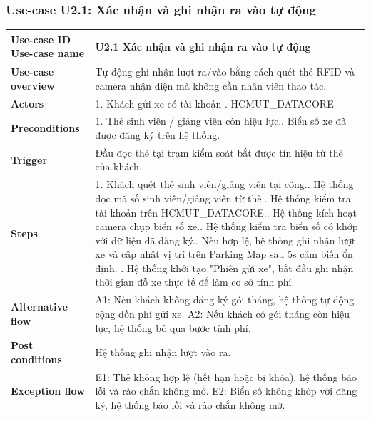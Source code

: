 \subsubsection{Use-case U2.1: Xác nhận và ghi nhận ra vào tự động}
\vspace{0.5cm}
\noindent
\begin{tabularx}{\textwidth}{|>{\raggedright\arraybackslash}p{4cm}|X|}
\hline
\textbf{Use-case ID} \newline \textbf{Use-case name} & U2.1 \newline \textbf{Xác nhận và ghi nhận ra vào tự động} \\ \hline
\textbf{Use-case overview} & Tự động ghi nhận lượt ra/vào bằng cách quét thẻ RFID và camera nhận diện mà không cần nhân viên thao tác.\\ \hline
\textbf{Actors} & 1. Khách gửi xe có tài khoản \newline 2. HCMUT\_DATACORE  \\ \hline
\textbf{Preconditions} &
1. Thẻ sinh viên / giảng viên còn hiệu lực.\newline
2. Biển số xe đã được đăng ký trên hệ thống. \\ \hline
\textbf{Trigger} & Đầu đọc thẻ tại trạm kiểm soát bắt được tín hiệu từ thẻ của khách. \\ \hline

\textbf{Steps} &
1. Khách quét thẻ sinh viên/giảng viên tại cổng.\newline
2. Hệ thống đọc mã số sinh viên/giảng viên từ thẻ.\newline
3. Hệ thống kiểm tra tài khoản trên HCMUT\_DATACORE.\newline
4. Hệ thống kích hoạt camera chụp biển số xe.\newline
5. Hệ thống kiểm tra biển số có khớp với dữ liệu đã đăng ký.\newline
6. Nếu hợp lệ, hệ thống ghi nhận lượt xe và cập nhật vị trí trên Parking Map sau 5s cảm biến ổn định.  \newline
7. Hệ thống khởi tạo "Phiên gửi xe", bắt đầu ghi nhận thời gian đỗ xe thực tế để làm cơ sở tính phí.
\\ \hline
\textbf{Alternative flow} &
A1: Nếu khách không đăng ký gói tháng, hệ thống tự động cộng dồn phí gửi xe.\newline
A2: Nếu khách có gói tháng còn hiệu lực, hệ thống bỏ qua bước tính phí. \\ \hline

\textbf{Post conditions} & Hệ thống ghi nhận lượt vào ra. \\ \hline

\textbf{Exception flow} &
E1: Thẻ không hợp lệ (hết hạn hoặc bị khóa), hệ thống báo lỗi và rào chắn không mở.\newline
E2: Biển số không khớp với đăng ký, hệ thống báo lỗi và rào chắn không mở. \\ \hline
\end{tabularx}


